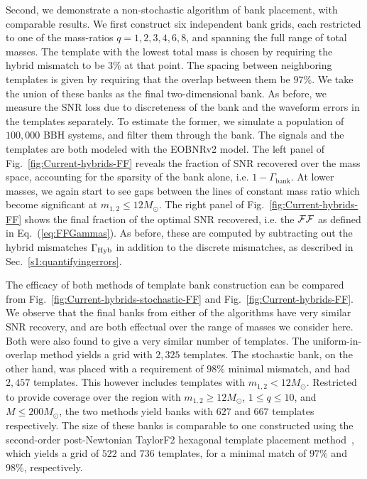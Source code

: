 Second, we demonstrate a non-stochastic algorithm of bank placement, with 
comparable results. We first construct six independent bank grids, each
restricted to one of the mass-ratios $q=1,2,3,4,6,8$, and spanning the full 
range of total masses. The template with the lowest total mass is chosen 
by requiring the hybrid mismatch to be $3\%$ at that point.
The spacing between neighboring templates is
given by requiring that the overlap between them be $97\%$. 
We take the union of these banks as the final 
two-dimensional bank. As before, we measure the SNR loss due to discreteness of
the bank and the waveform errors in the templates separately. To estimate the
former, we simulate a population of $100,000$ BBH systems, and filter
them through the bank. The signals and the templates are both modeled
with the EOBNRv2 model. The left panel of Fig.~\ref{fig:Current-hybrids-FF}
reveals the fraction of SNR recovered over the mass space, accounting for the 
sparsity of the bank alone, i.e. $1-\Gamma_\mathrm{bank}$. At lower masses, 
we again start to see gaps between the lines of constant mass ratio which
become significant at $m_{1,2} \leq 12M_\odot$. 
The right panel of Fig.~\ref{fig:Current-hybrids-FF} shows the final fraction 
of the optimal SNR recovered, i.e. the $\mathcal{FF}$ as defined in Eq.~(\ref{eq:FFGammas}). 
As before, these are computed by subtracting out the hybrid mismatches 
$\Gamma_{\mathrm{Hyb}}$ in addition to the discrete mismatches, as described in
Sec.~\ref{s1:quantifyingerrors}. 

The efficacy of both methods of template bank construction
can be compared from Fig.~\ref{fig:Current-hybrids-stochastic-FF} and 
Fig.~\ref{fig:Current-hybrids-FF}. We observe that the final banks from either
of the algorithms have very similar SNR recovery, and are both effectual over
the range of masses we consider here. Both were also found to give a very 
similar number of templates. The uniform-in-overlap method yields a grid 
with $2,325$ templates. The stochastic bank, on the other hand, was placed with a
requirement of $98\%$ minimal mismatch, and had $2,457$ templates. 
This however includes templates with $m_{1,2} < 12M_\odot$. Restricted
to provide coverage over the region with $m_{1,2}\geq 12M_\odot$, $1\leq q\leq 10$,
and $M\leq 200M_\odot$, the two methods yield banks with $627$ and $667$
templates respectively. The size of these banks is comparable to one 
constructed using the second-order post-Newtonian TaylorF2 hexagonal 
template placement method~\cite{SathyaBankPlacementTauN,BabaketalBankPlacement,
SathyaMetric2PN,Cokelaer:2007kx}, 
which yields a grid of $522$ and $736$ templates, for a minimal
match of $97\%$ and $98\%$, respectively.

